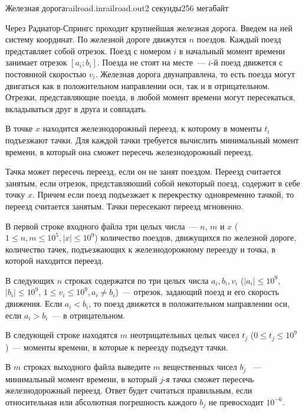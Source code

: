 \begin{problem}{Железная дорога}{railroad.in}{railroad.out}{2 секунды}{256 мегабайт}
                                                                    

Через Радиатор-Спрингс проходит крупнейшая железная дорога. 
Введем на ней систему координат.
По железной дороге движутся $n$ поездов. Каждый поезд представляет собой отрезок. 
Поезд с номером $i$ в начальный момент времени занимает отрезок $[a_i;b_i]$. Поезда не стоят на месте~--- $i$-й поезд движется с постоянной скоростью $v_i$. 
Железная дорога двунаправлена, то есть поезда могут двигаться как в положительном направлении оси, так и в отрицательном.
Отрезки, представляющие поезда, в любой момент времени могут пересекаться, вкладываться друг в друга и совпадать.

В точке $x$ находится железнодорожный переезд, к которому в моменты $t_i$ подъезжают тачки.
Для каждой тачки требуется вычислить минимальный момент времени, в который она сможет пересечь железнодорожный переезд.

Тачка может пересечь переезд, если он не занят поездом. Переезд считается занятым, если отрезок, представляюший
собой некоторый поезд, содержит в себе точку $x$. 
Причем если поезд подъезжает к перекрестку одновременно тачкой, то переезд считается занятым.
Тачки пересекают переезд мгновенно.

\InputFile
В первой строке входного файла три целых числа~--- $n$, $m$ и $x$ ($1 \le n, m \le 10^5, |x| \le 10^9$) количество поездов, движущихся по железной дороге, количество тачек, 
подъезжающих к железнодорожному переезду и точка, в которой находится переезд.

В следующих $n$ строках содержатся по три целых числа $a_i, b_i, v_i$ ($|a_i| \le 10^9$, $|b_i| \le 10^9$, $1 \le v_i \le 10^9, a_i \ne b_i$)~--- 
отрезок, задающий поезд и его скорость движения. Если $a_i < b_i$, то поезд движется в положительном направлении оси, если $a_i > b_i$~--- в отрицательном.

В следующей строке находятся $m$ неотрицательных целых чисел $t_j$ ($0 \le t_j \le 10^9$)~--- моменты времени, в которые к переезду подъедут тачки.

\OutputFile
В $m$ строках выходного файла выведите $m$ вещественных чисел $b_j$ ~--- минимальный момент времени, в который $j$-я тачка сможет пересечь железнодорожный переезд.
Ответ будет считаться правильным, если относительная или абсолютная погрешность каждого $b_j$ не превосходит $10^{-6}$.

\Example
\begin{example}%
%
%
\end{example}

\end{problem}
